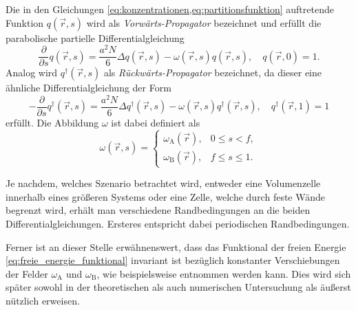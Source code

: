 \documentclass[../main.tex]{subfiles}
\begin{document}
Die in den Gleichungen \cref{eq:konzentrationen,eq:partitionsfunktion} auftretende Funktion $q(\vec{r}, s)$ wird als \emph{Vorwärts-Propagator} bezeichnet und erfüllt die parabolische partielle Differentialgleichung
\begin{equation}
\label{eq:forward_propagator}
        \frac{\partial}{\partial s} q(\vec{r}, s) = \frac{a^{2}N}{6} \Delta q(\vec{r}, s) - \omega(\vec{r}, s) q(\vec{r}, s), \quad
    q(\vec{r}, 0) = 1.
\end{equation}
Analog wird $q^{\dagger}(\vec{r}, s)$ als \emph{Rückwärts-Propagator} bezeichnet, da dieser eine ähnliche Differentialgleichung der Form
\begin{equation}
\label{eq:backward_propagator}
        -\frac{\partial}{\partial s}q^{\dagger}(\vec{r}, s) = \frac{a^{2}N}{6} \Delta q^{\dagger}(\vec{r}, s) - \omega(\vec{r}, s) q^{\dagger}(\vec{r}, s), \quad
    q^{\dagger}(\vec{r}, 1) = 1
\end{equation}%
erfüllt.
Die Abbildung $\omega$ ist dabei definiert als
\begin{equation}
    \omega(\vec{r}, s) = \begin{cases}
        \omega_{\mathrm{A}}(\vec{r}), & 0 \leq s < f,\\
        \omega_{\mathrm{B}}(\vec{r}), & f \leq s \leq 1.
    \end{cases}
\end{equation}


Je nachdem, welches Szenario betrachtet wird, entweder eine Volumenzelle innerhalb eines größeren Systems oder eine Zelle, welche durch feste Wände begrenzt wird, erhält man verschiedene Randbedingungen an die beiden Differentialgleichungen.
Ersteres entspricht dabei periodischen Randbedingungen.

Ferner ist an dieser Stelle erwähnenswert, dass das Funktional der freien Energie \cref{eq:freie_energie_funktional} invariant ist bezüglich konstanter Verschiebungen der Felder $\omega_{\mathrm{A}}$ und $\omega_{\mathrm{B}}$, wie beispielsweise \cite{Ceniceros:2006is} entnommen werden kann.
Dies wird sich später sowohl in der theoretischen als auch numerischen Untersuchung als äußerst nützlich erweisen.
\end{document}

